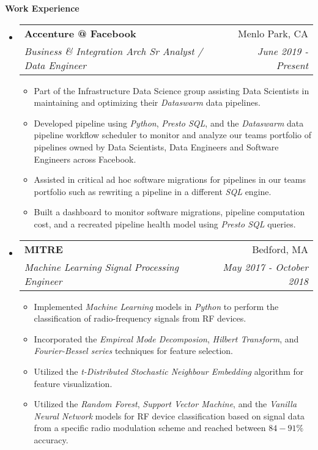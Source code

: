 \documentclass[letterpaper, 8pt]{extarticle}
\makeatletter
\newcommand{\resitem}[1]{\item #1 \vspace{-2pt}}
\newcommand{\resheading}[1]{{\large \colorbox{mygrey}{\begin{minipage}{0.99\textwidth}{\textbf{#1 \vphantom{p\^{E}}}}\end{minipage}}}}
\newcommand{\ressubheading}[4]{
\begin{tabular*}{7.40in}{l@{\extracolsep{\fill}}r}
		\textbf{#1} & #2 \\
		\textit{#3} & \textit{#4} \\
\end{tabular*}\vspace{-6pt}}
\makeatother
\begin{document}
\resheading{Work Experience}
\begin{itemize}
\setlength{\leftmargini}{0.5em}

\item
    \ressubheading{Accenture @ Facebook}{Menlo Park, CA}{Business \& Integration Arch Sr Analyst / Data Engineer}{June 2019 - Present}
    \begin{itemize}
        \resitem{Part of the Infrastructure Data Science group assisting Data Scientists in maintaining and optimizing their \emph{Dataswarm} data pipelines.}
        \resitem{Developed pipeline using \emph{Python}, \emph{Presto SQL}, and the \emph{Dataswarm} data pipeline workflow scheduler to monitor and analyze our teams portfolio of pipelines owned by Data Scientists, Data Engineers and Software Engineers across Facebook.}
        \resitem{Assisted in critical ad hoc software migrations for pipelines in our teams portfolio such as rewriting a pipeline in a different \emph{SQL} engine.}
        \resitem{Built a dashboard to monitor software migrations, pipeline computation cost, and a recreated pipeline health model using \emph{Presto SQL} queries.}
    \end{itemize}

\item
	\ressubheading{MITRE}{Bedford, MA}{Machine Learning Signal Processing Engineer}{May 2017 - October 2018}
	\begin{itemize}
	
	    \resitem{Implemented \emph{Machine Learning} models in \emph{Python} to perform the classification of radio-frequency signals from RF devices.}
	    
	    \resitem{Incorporated the \emph{Empircal Mode Decomposion}, \emph{Hilbert Transform}, and \emph{Fourier-Bessel series} techniques for feature selection.}
	    
	    \resitem{Utilized the  \emph{t-Distributed Stochastic Neighbour Embedding} algorithm for feature visualization.}
	    
	    \resitem{Utilized the \emph{Random Forest}, \emph{Support Vector Machine}, and the \emph{Vanilla Neural Network} models for RF device classification based on signal data from a specific radio modulation scheme and reached between $84 - 91 \% $ accuracy.}
	    

\end{itemize}
\end{itemize}
\end{document}
